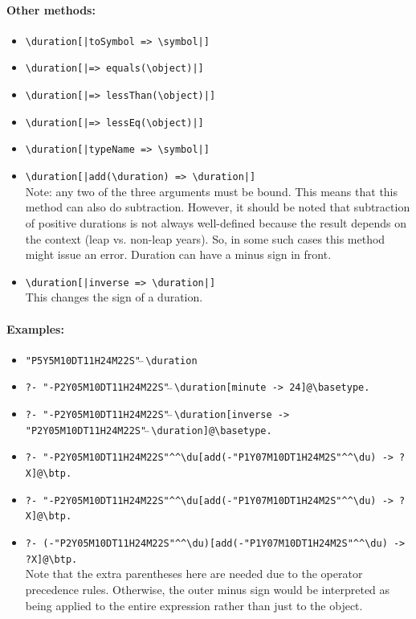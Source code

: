 \documentclass[11pt]{article}
\newcommand{\bs}{\textbackslash}
\begin{document}
\paragraph{Other methods:}
\begin{itemize}
\item {\tt \bs{}duration[|toSymbol => \bs{}symbol|]}  
\item {\tt \bs{}duration[|=> equals(\bs{}object)|]}  
\item {\tt \bs{}duration[|=> lessThan(\bs{}object)|]}  
\item {\tt \bs{}duration[|=> lessEq(\bs{}object)|]}  
\item {\tt \bs{}duration[|typeName => \bs{}symbol|]}  
\item {\tt \bs{}duration[|add(\bs{}duration) => \bs{}duration|]}  
  \\
  Note: any two of the three arguments must be bound. This means that this
  method can also do subtraction. However, it should be noted that
  subtraction of positive durations is not always well-defined because
  the result depends on the context (leap vs. non-leap years).
  So, in some such cases this method might issue an error.
    Duration can have a minus sign in front.
\item {\tt \bs{}duration[|inverse => \bs{}duration|]}  
  \\
  This changes the sign of a duration.
\end{itemize}

\paragraph{Examples:}
\begin{itemize}
\item {\tt "P5Y5M10DT11H24M22S"$\hat{~}\hat{~}$\bs{}duration} 
\item {\tt ?- "-P2Y05M10DT11H24M22S"$\hat{~}\hat{~}$\bs{}duration[minute -> 24]@\bs{}basetype.}
\item {\tt ?- "-P2Y05M10DT11H24M22S"$\hat{~}\hat{~}$\bs{}duration[inverse
    -> \\ \hspace*{2cm}"P2Y05M10DT11H24M22S"$\hat{~}\hat{~}$\bs{}duration]@\bs{}basetype.}
\item \verb|?- "-P2Y05M10DT11H24M22S"^^\du[add(-"P1Y07M10DT1H24M2S"^^\du) -> ?X]@\btp.|
\item \verb|?- "-P2Y05M10DT11H24M22S"^^\du[add(-"P1Y07M10DT1H24M2S"^^\du) -> ?X]@\btp.|
\item \verb|?- (-"P2Y05M10DT11H24M22S"^^\du)[add(-"P1Y07M10DT1H24M2S"^^\du) -> ?X]@\btp.|
\\
Note that the extra parentheses here are needed due to the operator
precedence rules. Otherwise, the outer minus sign would be interpreted as
being applied to the entire expression rather than just to the object.
\end{itemize}
\end{document}
